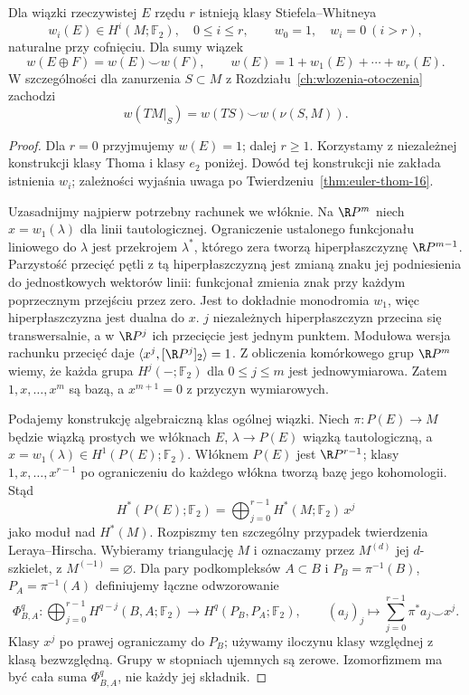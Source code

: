 \begin{twierdzenie}
\label{thm:wi-klasy-16}
Dla wiązki rzeczywistej
$E$ rzędu $r$ istnieją
klasy Stiefela--Whitneya
\[
 w_i(E)\in H^i(M;\mathbb F_2),
 \quad 0\leq i\leq r,\qquad
 w_0=1,\quad w_i=0\ (i>r),
\]
naturalne przy cofnięciu.
Dla sumy wiązek
\[
 w(E\oplus F)=w(E)\smile w(F),
 \qquad w(E)=1+w_1(E)+\cdots+w_r(E).
\]
W szczególności dla zanurzenia
$S\subset M$ z
Rozdziału~\ref{ch:wlozenia-otoczenia}
zachodzi
\begin{equation}\label{eq:w-normalne-16}
 w(TM|_S)=w(TS)\smile w(\nu(S,M)).
\end{equation}
\end{twierdzenie}
\begin{proof}
Dla $r=0$ przyjmujemy $w(E)=1$; dalej $r\geq1$.
Korzystamy z niezależnej konstrukcji klasy Thoma
i klasy $e_2$ poniżej. Dowód tej konstrukcji nie
zakłada istnienia $w_i$; zależności wyjaśnia uwaga
po Twierdzeniu~\ref{thm:euler-thom-16}.

Uzasadnijmy najpierw potrzebny rachunek we włóknie.
Na $\R P^m$ niech $x=w_1(\lambda)$ dla linii
tautologicznej. Ograniczenie ustalonego funkcjonału
liniowego do $\lambda$ jest przekrojem $\lambda^*$,
którego zera tworzą hiperpłaszczyznę $\R P^{m-1}$.
Parzystość przecięć pętli z tą hiperpłaszczyzną
jest zmianą znaku jej podniesienia do jednostkowych
wektorów linii: funkcjonał zmienia znak przy każdym
poprzecznym przejściu przez zero. Jest to dokładnie
monodromia $w_1$, więc hiperpłaszczyzna jest dualna do $x$.
$j$ niezależnych hiperpłaszczyzn przecina się
transwersalnie, a w $\R P^j$ ich przecięcie jest
jednym punktem. Modułowa wersja rachunku przecięć daje
$\langle x^j,[\R P^j]_2\rangle=1$.
Z obliczenia komórkowego grup $\R P^m$ wiemy, że
każda grupa $H^j(-;\mathbb F_2)$ dla $0\leq j\leq m$
jest jednowymiarowa. Zatem $1,x,\ldots,x^m$ są bazą,
a $x^{m+1}=0$ z przyczyn wymiarowych.

Podajemy konstrukcję algebraiczną klas ogólnej wiązki.
Niech $\pi:P(E)\to M$ będzie wiązką
prostych we włóknach $E$,
$\lambda\to P(E)$ wiązką
tautologiczną, a
$x=w_1(\lambda)\in
H^1(P(E);\mathbb F_2)$.
Włóknem $P(E)$ jest
$\R P^{r-1}$; klasy
$1,x,\ldots,x^{r-1}$
po ograniczeniu do
każdego włókna tworzą
bazę jego kohomologii.
Stąd
\[
 H^*(P(E);\mathbb F_2)
  =\bigoplus_{j=0}^{r-1}
     H^*(M;\mathbb F_2)\,x^j
\]
jako moduł nad $H^*(M)$.
Rozpiszmy ten szczególny przypadek twierdzenia Leraya--Hirscha.
Wybieramy triangulację $M$ i oznaczamy przez $M^{(d)}$ jej
$d$-szkielet, z $M^{(-1)}=\varnothing$. Dla pary podkompleksów
$A\subset B$ i $P_B=\pi^{-1}(B)$, $P_A=\pi^{-1}(A)$ definiujemy
łączne odwzorowanie
\[
 \Phi^q_{B,A}:\bigoplus_{j=0}^{r-1}H^{q-j}(B,A;\mathbb F_2)
 \longrightarrow H^q(P_B,P_A;\mathbb F_2),
 \qquad (a_j)_j\longmapsto\sum_{j=0}^{r-1}\pi^*a_j\smile x^j.
\]
Klasy $x^j$ po prawej ograniczamy do $P_B$; używamy iloczynu
klasy względnej z klasą bezwzględną. Grupy w stopniach ujemnych są zerowe.
Izomorfizmem ma być cała suma $\Phi^q_{B,A}$, nie każdy jej składnik.


\end{proof}
